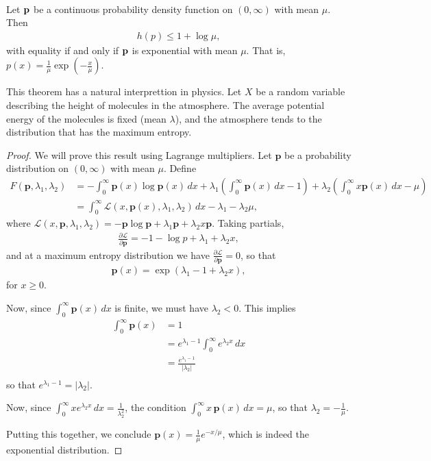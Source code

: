 \documentclass[13pt]{article}
\newcommand{\p}{\mathbf{p}}
\newcommand{\L}{\mathcal{L}}
\begin{document}
\\

\begin{theorem}
  Let $\mathbf{p}$ be a continuous probability density function on $(0, \infty)$ with mean $\mu$.  Then
  \begin{align*}
    h(p) \leq 1 + \log \mu,
  \end{align*}
  with equality if and only if $\mathbf{p}$ is exponential with mean $\mu$.  That is, $p(x) = \frac{1}{\mu} \exp (- \frac{x}{\mu})$.
\end{theorem}

This theorem has a natural interprettion in physics.  Let $X$ be a random variable describing the height of molecules in the atmosphere.  The average potential energy of the molecules is fixed (mean $\lambda$), and the atmosphere tends to the distribution that has the maximum entropy.

\begin{proof}
  We will prove this result using Lagrange multipliers.  Let $\p$ be a probability distribution on $(0, \infty)$ with mean $\mu$.  Define
  \begin{align*}
    F(\p, \lambda_1, \lambda_2) &= - \int_{0}^{\infty} \p(x) \log \p(x) \, dx + \lambda_1 \left( \int_{0}^{\infty} \p(x) \, dx - 1 \right) + \lambda_2 \left( \int_{0}^{\infty} x \p(x) \, dx - \mu \right)  \\
    &= \int_{0}^{\infty} \mathcal{L}(x, \p(x), \lambda_1, \lambda_2) \, dx - \lambda_1 - \lambda_2 \mu,
  \end{align*}
  where $\mathcal{L}(x, \p, \lambda_1, \lambda_2) = - \p \log \p + \lambda_1 \p + \lambda_2 x \p$.  Taking partials,
  \begin{align*}
    \frac{\partial \mathcal{L}}{\partial \p} = - 1 - \log p + \lambda_1 + \lambda_2 x,
  \end{align*}
  and at a maximum entropy distribution we have $\frac{\partial \L}{\partial \p} = 0$, so that
  \begin{align*}
    \p(x) = \exp \left( \lambda_1 - 1 + \lambda_2 x \right),
  \end{align*}
  for $x \geq 0$.  
  
  Now, since $\int_{0}^{\infty} \p(x) \, dx$ is finite, we must have $\lambda_2 < 0$.  This implies
  \begin{align*}
    \int_{0}^{\infty} \p(x) &= 1 \\
    &= e^{\lambda_1 - 1} \int_{0}^{\infty} e^{\lambda_2 x} \, dx \\
    &= \frac{e^{\lambda_1 - 1}}{|\lambda_2|} \\
  \end{align*}
  so that $e^{\lambda_1 - 1} = |\lambda_2|$.  
  
  Now, since $\int_{0}^{\infty} x e^{\lambda_2 x} \, dx = \frac{1}{\lambda_2^2}$, the condition $\int_{0}^{\infty} x \, \p(x) \, dx = \mu$, so that $\lambda_2 = - \frac{1}{\mu}$.  
  
  Putting this together, we conclude  $\p(x) = \frac{1}{\mu} e^{-x / \mu}$, which is indeed the exponential distribution.
\end{proof}
\end{document}
